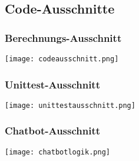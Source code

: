 \subsection{Code-Ausschnitte}

\subsubsection{Berechnungs-Ausschnitt}
\label{sec:Anhang:Berechnungs-Ausschnitt}

\texttt{[image: codeausschnitt.png]}

\subsubsection{Unittest-Ausschnitt}
\label{sec:Anhang:Unittest-Ausschnitt}

\texttt{[image: unittestausschnitt.png]}

\subsubsection{Chatbot-Ausschnitt}
\label{sec:Anhang:Chatbot-Ausschnitt}

\texttt{[image: chatbotlogik.png]}
